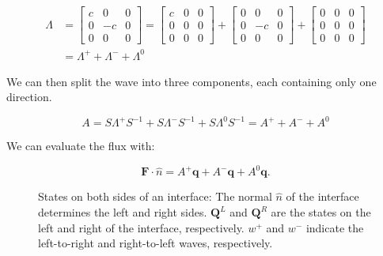 \begin{equation}
	\begin{split}
		\Lambda & = 
        \begin{bmatrix}
            c & 0 & 0 \\ 
            0 & -c & 0 \\ 
            0 & 0 & 0
		\end{bmatrix} = 
		\begin{bmatrix}
            c & 0 & 0 \\ 
            0 & 0 & 0 \\ 
            0 & 0 & 0
		\end{bmatrix} +
		\begin{bmatrix}
            0 & 0 & 0 \\ 
            0 & -c & 0 \\ 
            0 & 0 & 0
		\end{bmatrix} +
		\begin{bmatrix}
            0 & 0 & 0 \\ 
            0 & 0 & 0 \\ 
            0 & 0 & 0
		\end{bmatrix} \\
		&= \Lambda^+ + \Lambda^- + \Lambda^0
	\end{split}
\end{equation}

We can then split the wave into three components, each containing only one direction.

\begin{equation}
	A = S \Lambda^+ S^{-1} + S \Lambda^- S^{-1} + S \Lambda^0 S^{-1} = A^+ + A^- + A^0
\end{equation}

We can evaluate the flux with:

\begin{equation} \label{equ:flux}
	\mathbf{F} \cdot \widehat{n} = A^+\mathbf{q} + A^-\mathbf{q} + A^0 \mathbf{q}.
\end{equation}

\begin{figure}[H]
	\centering
	
	\caption{States on both sides of an interface: The normal \(\widehat{n}\) of the interface
	    determines the left and right sides. \(\mathbf{Q}^L\) and \(\mathbf{Q}^R\) are the states on the
	    left and right of the interface, respectively. \(w^+\) and \(w^-\) indicate the left-to-right
	    and right-to-left waves, respectively.}\label{fig:waves}
\end{figure}

